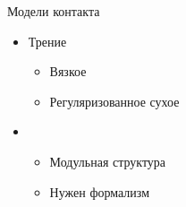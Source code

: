 \begin{frame}{Модели контакта}
    \begin{itemize}
        \item {
            Трение
            \begin{itemize}
                \item {
                    Вязкое
                }
                \item {
                    Регуляризованное сухое
                }
            \end{itemize}
        }
        \item {
            \begin{itemize}
                \item {
                    Модульная структура
                }
                \item {
                    Нужен формализм
                }
            \end{itemize}
        }
    \end{itemize}
\end{frame}